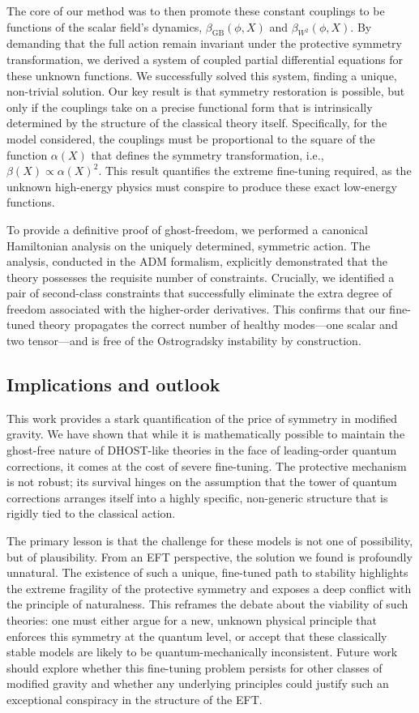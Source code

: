 \documentclass[twocolumn]{aastex631}
\begin{document}
The core of our method was to then promote these constant couplings to be functions of the scalar field's dynamics, $\beta_{\text{GB}}(\phi, X)$ and $\beta_{W^2}(\phi, X)$. By demanding that the full action remain invariant under the protective symmetry transformation, we derived a system of coupled partial differential equations for these unknown functions. We successfully solved this system, finding a unique, non-trivial solution. Our key result is that symmetry restoration is possible, but only if the couplings take on a precise functional form that is intrinsically determined by the structure of the classical theory itself. Specifically, for the model considered, the couplings must be proportional to the square of the function $\alpha(X)$ that defines the symmetry transformation, i.e., $\beta(X) \propto \alpha(X)^2$. This result quantifies the extreme fine-tuning required, as the unknown high-energy physics must conspire to produce these exact low-energy functions.

To provide a definitive proof of ghost-freedom, we performed a canonical Hamiltonian analysis on the uniquely determined, symmetric action. The analysis, conducted in the ADM formalism, explicitly demonstrated that the theory possesses the requisite number of constraints. Crucially, we identified a pair of second-class constraints that successfully eliminate the extra degree of freedom associated with the higher-order derivatives. This confirms that our fine-tuned theory propagates the correct number of healthy modes---one scalar and two tensor---and is free of the Ostrogradsky instability by construction.

\subsection{Implications and outlook}
This work provides a stark quantification of the price of symmetry in modified gravity. We have shown that while it is mathematically possible to maintain the ghost-free nature of DHOST-like theories in the face of leading-order quantum corrections, it comes at the cost of severe fine-tuning. The protective mechanism is not robust; its survival hinges on the assumption that the tower of quantum corrections arranges itself into a highly specific, non-generic structure that is rigidly tied to the classical action.

The primary lesson is that the challenge for these models is not one of possibility, but of plausibility. From an EFT perspective, the solution we found is profoundly unnatural. The existence of such a unique, fine-tuned path to stability highlights the extreme fragility of the protective symmetry and exposes a deep conflict with the principle of naturalness. This reframes the debate about the viability of such theories: one must either argue for a new, unknown physical principle that enforces this symmetry at the quantum level, or accept that these classically stable models are likely to be quantum-mechanically inconsistent. Future work should explore whether this fine-tuning problem persists for other classes of modified gravity and whether any underlying principles could justify such an exceptional conspiracy in the structure of the EFT.

{}

\end{document}
